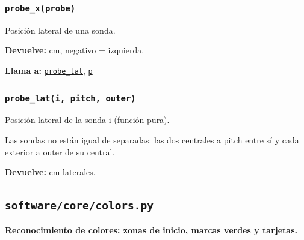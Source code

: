 \subsubsection{\texttt{probe\_\allowbreak{}x(probe)}}\label{fn:geometry:probe-x}
\noindent Posición lateral de una sonda.

\par{}\par\smallskip
\noindent\textbf{Devuelve:} cm, negativo = izquierda.\par
\noindent\textbf{Llama a:} \hyperref[fn:geometry:probe-lat]{\texttt{probe\_\allowbreak{}lat}}, \hyperref[fn:geometry:p]{\texttt{p}}\par

\subsubsection{\texttt{probe\_\allowbreak{}lat(i, pitch, outer)}}\label{fn:geometry:probe-lat}
\noindent Posición lateral de la sonda i (función pura).

Las sondas no están igual de separadas: las dos centrales a pitch entre sí y cada exterior a outer de su central.

\par{}\par\smallskip
\noindent\textbf{Devuelve:} cm laterales.\par

\subsection{\texttt{software/core/colors.py}}\label{mod:colors}
\textbf{Reconocimiento de colores: zonas de inicio, marcas verdes y tarjetas.}

